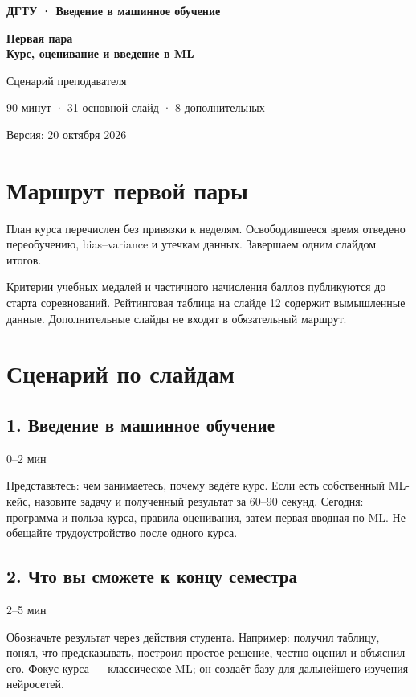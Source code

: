 \documentclass[11pt,a4paper]{article}
\newcommand{\timing}[1]{\hfill{\small\color{blue}#1}}
\begin{document}
\begin{titlepage}
\vspace*{25mm}
{\color{blue}\bfseries\Large ДГТУ · Введение в машинное обучение\par}
\vspace{10mm}
{\color{navy}\bfseries\fontsize{30}{35}\selectfont Первая пара\\[3mm] Курс, оценивание и введение в ML\par}
\vspace{12mm}
{\Large Сценарий преподавателя\par}
\vfill
{\large 90 минут · 31 основной слайд · 8 дополнительных\par}
{\small Версия: 20 октября 2026\par}
\end{titlepage}
\tableofcontents
\newpage
\section{Маршрут первой пары}
План курса перечислен без привязки к неделям. Освободившееся время отведено переобучению, bias–variance и утечкам данных. Завершаем одним слайдом итогов.

Критерии учебных медалей и частичного начисления баллов публикуются до старта соревнований. Рейтинговая таблица на слайде 12 содержит вымышленные данные. Дополнительные слайды не входят в обязательный маршрут.
\section{Сценарий по слайдам}
\subsection{1. Введение в машинное обучение}
\timing{0–2 мин}

Представьтесь: чем занимаетесь, почему ведёте курс. Если есть собственный ML-кейс, назовите задачу и полученный результат за 60–90 секунд. Сегодня: программа и польза курса, правила оценивания, затем первая вводная по ML. Не обещайте трудоустройство после одного курса.

\subsection{2. Что вы сможете к концу семестра}
\timing{2–5 мин}

Обозначьте результат через действия студента. Например: получил таблицу, понял, что предсказывать, построил простое решение, честно оценил и объяснил его. Фокус курса — классическое ML; он создаёт базу для дальнейшего изучения нейросетей.
\end{document}
